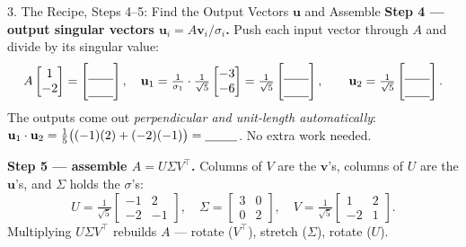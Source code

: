 \documentclass[10pt]{article}
\newcommand{\uu}{\mathbf{u}}
\newcommand{\vv}{\mathbf{v}}
\newcommand{\T}{^{\top}}
\begin{document}
\begin{notesbox}{3. The Recipe, Steps 4--5: Find the Output Vectors $\uu$ and Assemble}
\textbf{Step 4 --- output singular vectors $\uu_i=A\vv_i/\sigma_i$.} Push each input vector through $A$
and divide by its singular value:
\[
  A\begin{bmatrix} 1\\ -2 \end{bmatrix}=\begin{bmatrix}\rule{0pt}{1.1em}\blank{0.7cm}\\[2pt]\blank{0.7cm}\end{bmatrix},\quad
  \uu_1=\tfrac{1}{\sigma_1}\cdot\tfrac{1}{\sqrt5}\begin{bmatrix} -3\\ -6 \end{bmatrix}
  =\tfrac{1}{\sqrt5}\begin{bmatrix}\rule{0pt}{1.1em}\blank{0.7cm}\\[2pt]\blank{0.7cm}\end{bmatrix},\qquad
  \uu_2=\tfrac{1}{\sqrt5}\begin{bmatrix}\rule{0pt}{1.1em}\blank{0.7cm}\\[2pt]\blank{0.7cm}\end{bmatrix}.
\]
The outputs come out \emph{perpendicular and unit-length automatically}:
$\uu_1\cdot\uu_2=\tfrac15\big((-1)(2)+(-2)(-1)\big)=\blank{0.9cm}$. No extra work needed.

\textbf{Step 5 --- assemble $A=U\Sigma V\T$.} Columns of $V$ are the $\vv$'s, columns of $U$ are the
$\uu$'s, and $\Sigma$ holds the $\sigma$'s:
\[
  U=\tfrac{1}{\sqrt5}\begin{bmatrix} -1 & 2\\ -2 & -1 \end{bmatrix},\quad
  \Sigma=\begin{bmatrix} 3 & 0\\ 0 & 2 \end{bmatrix},\quad
  V=\tfrac{1}{\sqrt5}\begin{bmatrix} 1 & 2\\ -2 & 1 \end{bmatrix}.
\]
Multiplying $U\Sigma V\T$ rebuilds $A$ --- rotate ($V\T$), stretch ($\Sigma$), rotate ($U$).
\end{notesbox}
\end{document}
